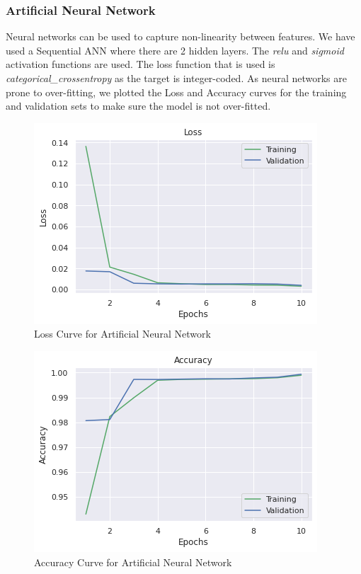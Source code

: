 \documentclass{article}
\begin{document}
\subsubsection{Artificial Neural Network}

Neural networks can be used to capture non-linearity between features. We have used a Sequential ANN where there are 2 hidden layers. The \emph{relu} and \emph{sigmoid} activation functions are used. The loss function that is used is \emph{categorical\_crossentropy} as the target is integer-coded. As neural networks are prone to over-fitting, we plotted the Loss and Accuracy curves for the training and validation sets to make sure the model is not over-fitted.

\begin{figure}[H]
  \centering
  \includegraphics[scale=0.75]{lossevo.png}
  \caption{Loss Curve for Artificial Neural Network}
\end{figure}

\begin{figure}[H]
  \centering
  \includegraphics[scale=0.75]{accevo.png}
  \caption{Accuracy Curve for Artificial Neural Network}
\end{figure}
\end{document}
